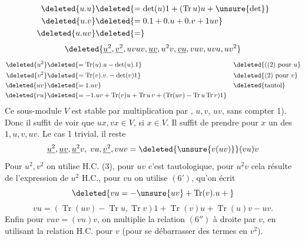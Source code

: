 \[\begin{aligned}
\deleted{u.u}&\deleted{=\det(u)1+(\operatorname{Tr}u)u+\unsure{\det}}\\
\deleted{u.v}&\deleted{=0.1+0.u+0.v+1uv}\\
\deleted{u.uv}&\deleted{=}
\end{aligned}\]
\[ \deleted{\underline{u^2},\underline{v^2},uvuv,\underline{uv},u^2v,\underline{vu},vuv,uvu,uv^2} \]
\[\begin{aligned}
\deleted{u^2}&\deleted{=\operatorname{Tr}(u).u-\det(u).1}&&\deleted{\text{((2) pour }u}\\
\deleted{v^2}&\deleted{=\operatorname{Tr}(v).v.-\det(v)1}&&\deleted{\text{(2) pour }v}\\
\deleted{uv}&\deleted{=1.uv}&&\deleted{\text{tautol}}\\
\deleted{vu}&\deleted{=-1.uv+\operatorname{Tr}(v)u+\operatorname{Tr}u\,v+(\operatorname{Tr}(uv)-\operatorname{Tr}u\operatorname{Tr}v)1}
\end{aligned}\]
Ce sous-module $V$ est stable par multiplication  par , $u,v$,   $uv$, sans compter 1). Donc il suffit de voir que $ux,vx\in V$, si $x\in V$. Il suffit de prendre pour $x$ un des  $1,u,v,uv$. Le cas 1  trivial, il reste
\[ \underline{u^2},\underline{uv},\underline{u^2}v,\;vu,\underline{v^2},vuv=\deleted{\unsure{v(uv)}}(vu)v \]
Pour $u^2,v^2$ on utilise H.C. (3), pour $uv$ c'est tautologique, pour $u^2v$ cela résulte de l'expression de $u^2$ H.C., pour $vu$ on utilise $(6')$, qu'on écrit
\[ \deleted{vu=-\unsure{uv}+\operatorname{Tr}(v).u+{}} \]
\[ vu=(\operatorname{Tr}(uv)-\operatorname{Tr}u,\operatorname{Tr}v)1+\operatorname{Tr}(v)u+\operatorname{Tr}(u)v-uv. \tag*{$(6'')$} \]
Enfin pour  $vuv=(vu)v$, on multiplie la relation $(6'')$ à droite par $v$, en utilisant la relation H.C. pour $v$ (pour se débarrasser des termes en $v^2$).
